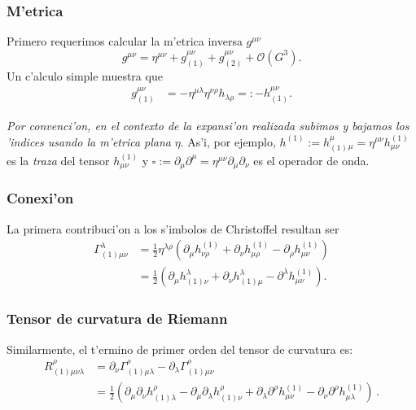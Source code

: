 \subsubsection{M'etrica}

Primero requerimos calcular la m'etrica inversa $g^{\mu\nu}$
\begin{equation}
g^{\mu\nu}=\eta^{\mu\nu}+g^{\mu\nu}_{(1)}+g^{\mu\nu}_{(2)}+\mathcal{O}(G^3).
\end{equation}
Un c'alculo simple muestra que
\begin{align}
g^{\mu\nu}_{(1)}&=-\eta^{\mu\lambda}\eta^{\nu\rho}h_{\lambda\rho}=:-h^{\mu\nu}_{(1)} .
\end{align}

\textit{Por convenci'on, en el contexto de la expansi'on realizada subimos y bajamos los 'indices usando la m'etrica plana} $\eta$. As'i, por ejemplo, $h^{(1)}:=h^\mu_{(1)}{}_\mu=\eta^{\mu\nu}h^{(1)}_{\mu\nu}$ es la \textit{traza} del tensor $h^{(1)}_{\mu\nu}$ y $\square :=\partial_\mu\partial^\mu=\eta^{\mu\nu}\partial_\mu\partial_\nu$ es el operador de onda.
\subsubsection{Conexi'on}\label{sec:conG1}

La primera contribuci'on a los s'imbolos de Christoffel resultan ser
\begin{align}
\Gamma^\lambda_{(1)\mu\nu}&=\frac{1}2\eta^{\lambda\rho}\left(\partial_\mu
h^{(1)}_{\nu\rho} +\partial_\nu h^{(1)}_{\mu\rho} - \partial_\rho h^{(1)}_{\mu\nu}\right)\\
&=\frac{1}{2}\left(\partial_\mu h^\lambda_{(1)\nu} + \partial_\nu h^\lambda_{(1)\mu} -\partial^\lambda h^{(1)}_{\mu\nu}\right) . \label{Gamma1}
\end{align}

\subsubsection{Tensor de curvatura de Riemann}
Similarmente, el t'ermino de primer orden del tensor de curvatura es:
\begin{align}
R^\rho_{(1)\mu\nu\lambda}&= \partial_\nu
\Gamma^\rho_{(1)\mu\lambda}-\partial_\lambda \Gamma^\rho_{(1)\mu\nu} \\
&= \frac{1}{2}\left(\partial_\mu\partial_\nu h^\rho_{(1)\lambda} -
\partial_\mu\partial_\lambda h^\rho_{(1)\nu} + \partial_\lambda \partial^\rho
h^{(1)}_{\mu\nu} - \partial_\nu\partial^\rho h^{(1)}_{\mu\lambda}\right)  \, .
\end{align}

